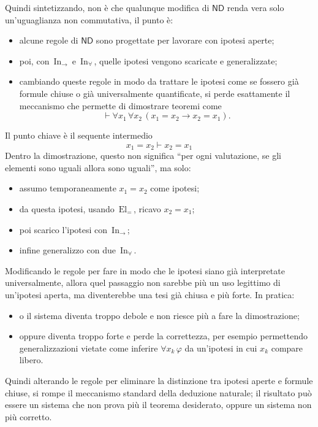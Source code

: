 \begin{remark}
    Quindi sintetizzando, non è che qualunque modifica di $\mathsf{ND}$ renda vera solo un'uguaglianza non commutativa, il punto è:
    \begin{itemize}
        \item alcune regole di $\mathsf{ND}$ sono progettate per lavorare con ipotesi aperte;
        \item poi, con $\,\mathrm{In}_\to\,$ e $\,\mathrm{In}_\forall\,$, quelle ipotesi vengono scaricate e generalizzate;
        \item cambiando queste regole in modo da trattare le ipotesi come se fossero già formule chiuse o già universalmente quantificate,
        si perde esattamente il meccanismo che permette di dimostrare teoremi come
        \[\vdash \forall x_1\,\forall x_2\,(x_1=x_2 \to x_2=x_1).\]
    \end{itemize}
    Il punto chiave è il sequente intermedio
    \[x_1=x_2 \vdash x_2=x_1 \]
    Dentro la dimostrazione, questo non significa ``per ogni valutazione, se gli elementi sono uguali allora sono uguali'', ma solo:
    \begin{itemize}
        \item assumo temporaneamente $x_1=x_2$ come ipotesi;
        \item da questa ipotesi, usando $\,\mathrm{El}_=\,$, ricavo $x_2=x_1$;
        \item poi scarico l'ipotesi con $\,\mathrm{In}_\to\,$;
        \item infine generalizzo con due $\,\mathrm{In}_\forall\,$.
    \end{itemize}
    Modificando le regole per fare in modo che le ipotesi siano già interpretate universalmente, allora quel passaggio non sarebbe più un uso legittimo di un'ipotesi aperta, ma diventerebbe una tesi già chiusa e più forte. In pratica:
    \begin{itemize}
        \item o il sistema diventa troppo debole e non riesce più a fare la dimostrazione;
        \item oppure diventa troppo forte e perde la correttezza, per esempio permettendo generalizzazioni vietate come inferire $\forall x_k\,\varphi$ da un'ipotesi in cui $x_k$ compare libero.
    \end{itemize}
    Quindi alterando le regole per eliminare la distinzione tra ipotesi aperte e formule chiuse, si rompe il meccanismo standard della deduzione naturale; il risultato può essere un sistema che non prova più il teorema desiderato, oppure un sistema non più corretto.
\end{remark}

